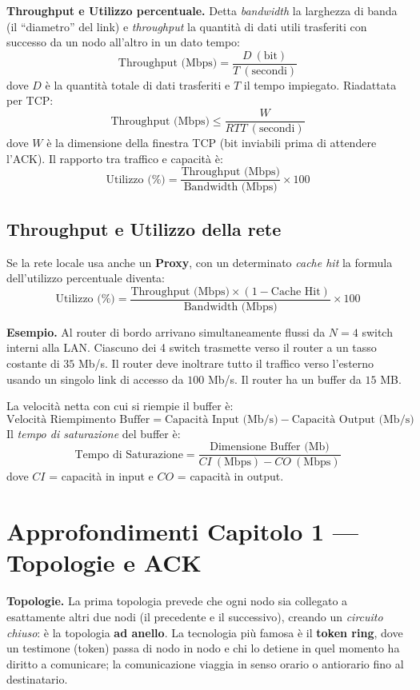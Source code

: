 \documentclass[11pt,a4paper]{report}
\newcommand{\pagemark}[1]{\marginpar{\footnotesize\color{gray}p.#1}}
\begin{document}
\textbf{Throughput e Utilizzo percentuale.} Detta \emph{bandwidth} la larghezza di banda (il ``diametro'' del link) e \emph{throughput} la quantità di dati utili trasferiti con successo da un nodo all'altro in un dato tempo:
\[ \text{Throughput (Mbps)} = \frac{D\ (\text{bit})}{T\ (\text{secondi})} \]
dove $D$ è la quantità totale di dati trasferiti e $T$ il tempo impiegato. Riadattata per TCP:
\[ \text{Throughput (Mbps)} \le \frac{W}{RTT\ (\text{secondi})} \]
dove $W$ è la dimensione della finestra TCP (bit inviabili prima di attendere l'ACK). Il rapporto tra traffico e capacità è:
\[ \text{Utilizzo (\%)} = \frac{\text{Throughput (Mbps)}}{\text{Bandwidth (Mbps)}}\times 100 \]

\section{Throughput e Utilizzo della rete}\label{teoria:buffer}\pagemark{13}
Se la rete locale usa anche un \textbf{Proxy}, con un determinato \emph{cache hit} la formula dell'utilizzo percentuale diventa:
\[ \text{Utilizzo (\%)} = \frac{\text{Throughput (Mbps)}\times(1-\text{Cache Hit})}{\text{Bandwidth (Mbps)}}\times 100 \]

\textbf{Esempio.} Al router di bordo arrivano simultaneamente flussi da $N=4$ switch interni alla LAN. Ciascuno dei 4 switch trasmette verso il router a un tasso costante di $35$ Mb/s. Il router deve inoltrare tutto il traffico verso l'esterno usando un singolo link di accesso da $100$ Mb/s. Il router ha un buffer da $15$ MB.

La velocità netta con cui si riempie il buffer è:
\[ \text{Velocità Riempimento Buffer} = \text{Capacità Input (Mb/s)} - \text{Capacità Output (Mb/s)} \]
Il \emph{tempo di saturazione} del buffer è:
\[ \text{Tempo di Saturazione} = \frac{\text{Dimensione Buffer (Mb)}}{CI\ (\text{Mbps}) - CO\ (\text{Mbps})} \]
dove $CI$ = capacità in input e $CO$ = capacità in output.

\chapter{Approfondimenti Capitolo 1 — Topologie e ACK}\pagemark{14}
\textbf{Topologie.} La prima topologia prevede che ogni nodo sia collegato a esattamente altri due nodi (il precedente e il successivo), creando un \emph{circuito chiuso}: è la topologia \textbf{ad anello}. La tecnologia più famosa è il \textbf{token ring}, dove un testimone (token) passa di nodo in nodo e chi lo detiene in quel momento ha diritto a comunicare; la comunicazione viaggia in senso orario o antiorario fino al destinatario.
\end{document}
